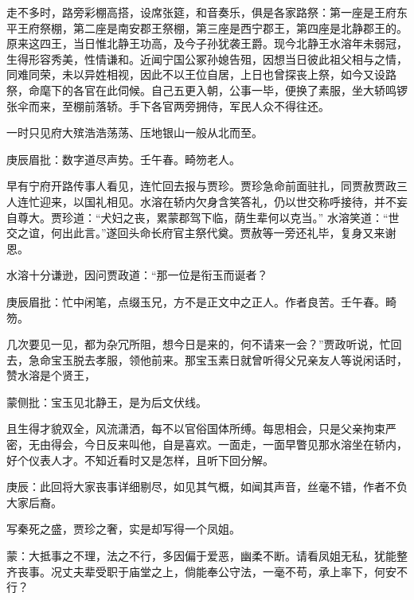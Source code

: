 \begin{parag}
    走不多时，路旁彩棚高搭，设席张筵，和音奏乐，俱是各家路祭：第一座是王府东平王府祭棚，第二座是南安郡王祭棚，第三座是西宁郡王，第四座是北静郡王的。原来这四王，当日惟北静王功高，及今子孙犹袭王爵。现今北静王水溶年未弱冠，生得形容秀美，性情谦和。近闻宁国公冢孙媳告殂，因想当日彼此祖父相与之情，同难同荣，未以异姓相视，因此不以王位自居，上日也曾探丧上祭，如今又设路祭，命麾下的各官在此伺候。自己五更入朝，公事一毕，便换了素服，坐大轿鸣锣张伞而来，至棚前落轿。手下各官两旁拥侍，军民人众不得往还。
\end{parag}


\begin{parag}
    一时只见府大殡浩浩荡荡、压地银山一般从北而至。\begin{note}庚辰眉批：数字道尽声势。壬午春。畸笏老人。\end{note}早有宁府开路传事人看见，连忙回去报与贾珍。贾珍急命前面驻扎，同贾赦贾政三人连忙迎来，以国礼相见。水溶在轿内欠身含笑答礼，仍以世交称呼接待，并不妄自尊大。贾珍道：“犬妇之丧，累蒙郡驾下临，荫生辈何以克当。” 水溶笑道：“世交之谊，何出此言。”遂回头命长府官主祭代奠。贾赦等一旁还礼毕，复身又来谢恩。
\end{parag}


\begin{parag}
    水溶十分谦逊，因问贾政道：“那一位是衔玉而诞者？\begin{note}庚辰眉批：忙中闲笔，点缀玉兄，方不是正文中之正人。作者良苦。壬午春。畸笏。\end{note}几次要见一见，都为杂冗所阻，想今日是来的，何不请来一会？”贾政听说，忙回去，急命宝玉脱去孝服，领他前来。那宝玉素日就曾听得父兄亲友人等说闲话时，赞水溶是个贤王，\begin{note}蒙侧批：宝玉见北静王，是为后文伏线。\end{note}且生得才貌双全，风流潇洒，每不以官俗国体所缚。每思相会，只是父亲拘束严密，无由得会，今日反来叫他，自是喜欢。一面走，一面早瞥见那水溶坐在轿内，好个仪表人才。不知近看时又是怎样，且听下回分解。
\end{parag}


\begin{parag}
    \begin{note}庚辰：此回将大家丧事详细剔尽，如见其气概，如闻其声音，丝毫不错，作者不负大家后裔。\end{note}
\end{parag}


\begin{parag}
    \begin{note}写秦死之盛，贾珍之奢，实是却写得一个凤姐。\end{note}
\end{parag}


\begin{parag}
    \begin{note}蒙：大抵事之不理，法之不行，多因偏于爱恶，幽柔不断。请看凤姐无私，犹能整齐丧事。况丈夫辈受职于庙堂之上，倘能奉公守法，一毫不苟，承上率下，何安不行？\end{note}
\end{parag}